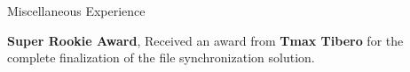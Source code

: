 \begin{rubric}{Miscellaneous Experience}

\entry*[2021] \textbf{Super Rookie Award}, Received an award from \textbf{Tmax Tibero} for the complete finalization of the file synchronization solution.

%


\end{rubric}